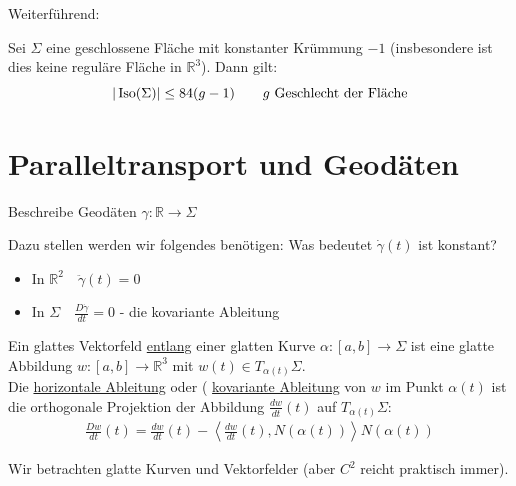 \documentclass[../main.tex]{subfiles}
\begin{document}
Weiterführend:
\begin{theorem}[Hurwitz]
    Sei $\Sigma$ eine geschlossene Fläche mit konstanter Krümmung $-1$ (insbesondere ist dies keine reguläre Fläche in $\mathbb{R}^3$).
    Dann gilt:
    $$|\operatorname{Iso} (\Sigma)| \le 84(g-1) \qquad \text{$g$ Geschlecht der Fläche}$$
\end{theorem}

\section{Paralleltransport und Geodäten}

\begin{goal}
Beschreibe Geodäten $\gamma : \mathbb{R} \to \Sigma$
\end{goal}

\begin{question}
Dazu stellen werden wir folgendes benötigen: Was bedeutet $\dot{\gamma}(t)$ ist konstant?
\begin{itemize}
    \item In $\mathbb{R}^2 \quad \ddot{\gamma}(t)=0$
    \item In $\Sigma \quad \frac{D\dot{\gamma}}{dt}=0$ - die kovariante Ableitung
\end{itemize}
\end{question}

\begin{definition}
Ein glattes Vektorfeld \underline{entlang} einer glatten Kurve $\alpha : [a,b] \to \Sigma$ ist eine glatte Abbildung $w : [a,b] \to \mathbb{R}^3$ mit $w(t) \in T_{\alpha(t)}\Sigma$. \\
Die \underline{horizontale Ableitung} oder ( \underline{kovariante Ableitung} von $w$ im Punkt $\alpha(t)$ ist die orthogonale Projektion der Abbildung $\frac{dw}{dt}(t)$ auf $T_{\alpha(t)}\Sigma :$
\begin{align*}
    \frac{Dw}{dt}(t) = \frac{dw}{dt}(t) - \left\langle \frac{dw}{dt}(t), N(\alpha(t))\right\rangle N(\alpha(t))
\end{align*}
\end{definition}

\begin{remark}
Wir betrachten glatte Kurven und Vektorfelder (aber $C^2$ reicht praktisch immer).
\end{remark}
\end{document}
